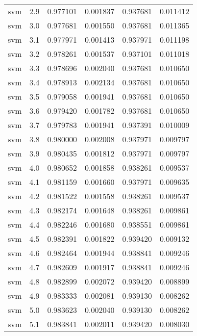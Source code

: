 \begin{tabular}{lrrrrr}
     svm &        2.9 &    0.977101 &   0.001837 &   0.937681 &  0.011412 \\
     svm &        3.0 &    0.977681 &   0.001550 &   0.937681 &  0.011365 \\
     svm &        3.1 &    0.977971 &   0.001413 &   0.937971 &  0.011198 \\
     svm &        3.2 &    0.978261 &   0.001537 &   0.937101 &  0.011018 \\
     svm &        3.3 &    0.978696 &   0.002040 &   0.937681 &  0.010650 \\
     svm &        3.4 &    0.978913 &   0.002134 &   0.937681 &  0.010650 \\
     svm &        3.5 &    0.979058 &   0.001941 &   0.937681 &  0.010650 \\
     svm &        3.6 &    0.979420 &   0.001782 &   0.937681 &  0.010650 \\
     svm &        3.7 &    0.979783 &   0.001941 &   0.937391 &  0.010009 \\
     svm &        3.8 &    0.980000 &   0.002008 &   0.937971 &  0.009797 \\
     svm &        3.9 &    0.980435 &   0.001812 &   0.937971 &  0.009797 \\
     svm &        4.0 &    0.980652 &   0.001858 &   0.938261 &  0.009537 \\
     svm &        4.1 &    0.981159 &   0.001660 &   0.937971 &  0.009635 \\
     svm &        4.2 &    0.981522 &   0.001558 &   0.938261 &  0.009537 \\
     svm &        4.3 &    0.982174 &   0.001648 &   0.938261 &  0.009861 \\
     svm &        4.4 &    0.982246 &   0.001680 &   0.938551 &  0.009861 \\
     svm &        4.5 &    0.982391 &   0.001822 &   0.939420 &  0.009132 \\
     svm &        4.6 &    0.982464 &   0.001944 &   0.938841 &  0.009246 \\
     svm &        4.7 &    0.982609 &   0.001917 &   0.938841 &  0.009246 \\
     svm &        4.8 &    0.982899 &   0.002072 &   0.939420 &  0.008899 \\
     svm &        4.9 &    0.983333 &   0.002081 &   0.939130 &  0.008262 \\
     svm &        5.0 &    0.983623 &   0.002040 &   0.939130 &  0.008262 \\
     svm &        5.1 &    0.983841 &   0.002011 &   0.939420 &  0.008030 \\

\end{tabular}
